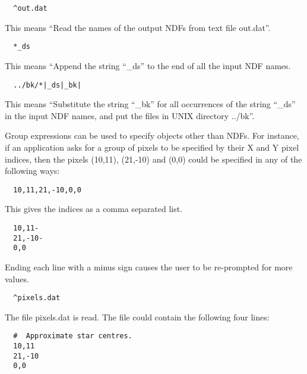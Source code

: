 \begin{itemize}
\small
\begin{verbatim}
  ^out.dat
\end{verbatim}
\normalsize
\vspace{-3mm}
This means ``Read the names of the output {\small NDF}s from 
text file out.dat''.

\small
\begin{verbatim}
  *_ds
\end{verbatim}
\normalsize
\vspace{-3mm}
This means ``Append the string ``\_ds'' to the end of all 
                      the input {\small NDF} names.

\small
\begin{verbatim}
  ../bk/*|_ds|_bk|
\end{verbatim}
\normalsize
\vspace{-3mm}
This means ``Substitute the string ``\_bk'' for all  occurrences of the string
``\_ds'' in the  input {\small NDF} names, and put the files in {\small UNIX} 
directory ../bk''.
\end{itemize}

Group expressions can be used to specify objects other than {\small
NDF}s. For instance,  if an application asks for a group of pixels to
be specified by  their X and Y pixel indices, then the pixels (10,11),
(21,-10) and (0,0) could be specified in any of the following ways:

\small
\begin{verbatim}
  10,11,21,-10,0,0  
\end{verbatim}
\normalsize
\vspace{-3mm}
This gives the indices as a comma separated list.

\small
\begin{verbatim}
  10,11-
  21,-10-
  0,0
\end{verbatim}
\normalsize
\vspace{-3mm}
Ending each line with a minus  sign causes the user to be re-prompted for more
values.

\small
\begin{verbatim}
  ^pixels.dat
\end{verbatim}
\normalsize
\vspace{-3mm}
The file pixels.dat is read. The file could contain the  following four lines:

\small
\begin{verbatim}
  #  Approximate star centres.
  10,11
  21,-10
  0,0
\end{verbatim}
\normalsize

